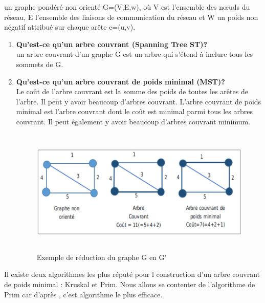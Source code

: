 
un graphe pondéré non orienté G=(V,E,w), où V est l’ensemble des nœuds du réseau, E l’ensemble des liaisons de communication du réseau et W un poids non négatif attribué sur chaque arête e=(u,v).

\begin{enumerate}[label=\alph*)]

	\item \textbf{Qu'est-ce qu'un arbre couvrant (Spanning Tree ST)?}\\
	un arbre couvrant d’un graphe G est un arbre qui s'étend à inclure tous les sommets de G.

	\item \textbf{Qu'est-ce qu'un arbre couvrant de poids minimal (MST)?}\\
	Le coût de l'arbre couvrant est la somme des poids de toutes les arêtes de l'arbre. Il peut y avoir beaucoup d'arbres couvrant. L’arbre couvrant de poids minimal est l'arbre couvrant dont le coût est minimal parmi tous les arbres couvrant. Il peut également y avoir beaucoup d'arbres couvrant minimum.\\

\begin{figure}[H]
	\centering
	\includegraphics[width=15cm,height=6cm]{Chap3/2.png}
	\caption{Exemple de réduction du graphe G en G’}
	\label{fig:32}
\end{figure}

\end{enumerate}
	
	
Il existe deux algorithmes les plus réputé pour l construction d’un arbre  couvrant de poids minimal :  Kruskal et Prim. Nous allons se contenter de l’algorithme de Prim car d’après \cite{prim1957shortest}, c’est algorithme le plus efficace.\\


